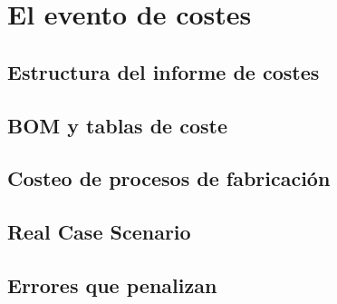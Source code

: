 \chapter{El evento de costes}
\label{ch:evento_costes}

\begin{objetivos}
  \item {}
  \item {}
  \item {}
\end{objetivos}


\section{Estructura del informe de costes}
\label{sec:evento_costes:01}

\section{BOM y tablas de coste}
\label{sec:evento_costes:02}

\section{Costeo de procesos de fabricación}
\label{sec:evento_costes:03}

\section{Real Case Scenario}
\label{sec:evento_costes:04}

\section{Errores que penalizan}
\label{sec:evento_costes:05}


